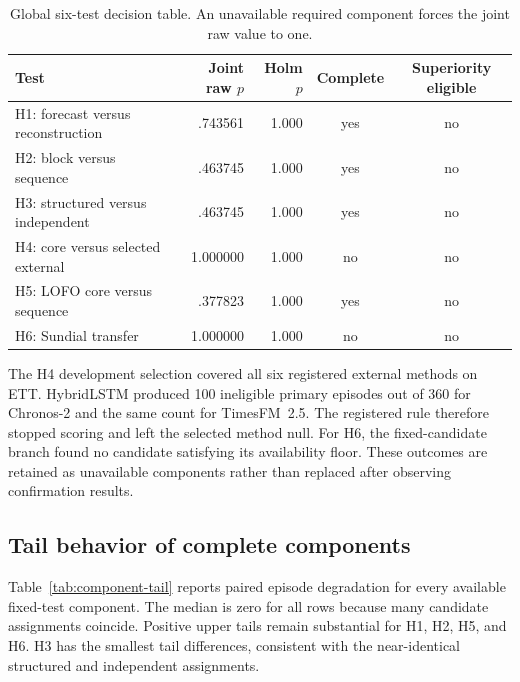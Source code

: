 \begin{table}[h]
\caption{Global six-test decision table. An unavailable required component forces the joint raw value to one.}
\label{tab:six-fixed}
\centering
\small
\begin{tabular}{lrrcc}
\toprule
Test & Joint raw $p$ & Holm $p$ & Complete & Superiority eligible \\
\midrule
H1: forecast versus reconstruction & .743561 & 1.000 & yes & no \\
H2: block versus sequence & .463745 & 1.000 & yes & no \\
H3: structured versus independent & .463745 & 1.000 & yes & no \\
H4: core versus selected external & 1.000000 & 1.000 & no & no \\
H5: LOFO core versus sequence & .377823 & 1.000 & yes & no \\
H6: Sundial transfer & 1.000000 & 1.000 & no & no \\
\bottomrule
\end{tabular}
\end{table}

The H4 development selection covered all six registered external methods on ETT. HybridLSTM produced 100 ineligible primary episodes out of 360 for Chronos-2 and the same count for TimesFM~2.5. The registered rule  therefore stopped scoring and left the selected method null. For H6, the fixed-candidate branch found no candidate satisfying its availability floor. These outcomes are retained as unavailable components rather than replaced after observing confirmation results.

\subsection{Tail behavior of complete components}

Table~\ref{tab:component-tail} reports paired episode degradation for every available fixed-test component. The median is zero for all rows because many candidate assignments coincide. Positive upper tails remain substantial for H1, H2, H5, and H6. H3 has the smallest tail differences, consistent with the near-identical structured and independent assignments.

